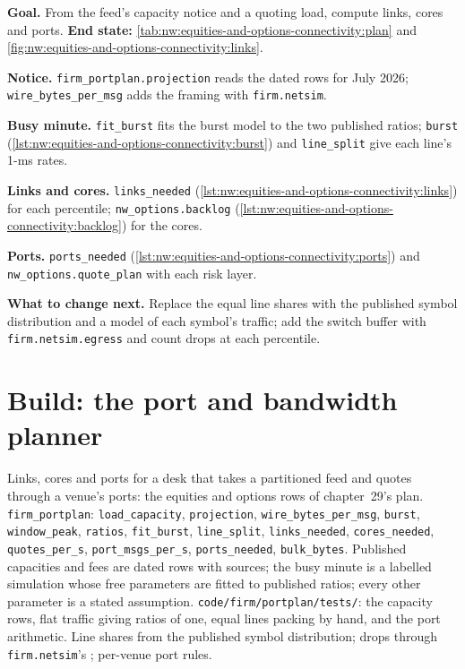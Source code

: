 \begin{tutorial}
\textbf{Goal.} From the feed's capacity notice and a quoting load, compute links, cores and ports.
\textbf{End state:} \cref{tab:nw:equities-and-options-connectivity:plan} and \cref{fig:nw:equities-and-options-connectivity:links}.
\begin{tutsteps}
\item \textbf{Notice.} \texttt{firm\_portplan.projection} reads the dated rows for July 2026; \texttt{wire\_bytes\_per\_msg} adds the
  framing with \texttt{firm.netsim}.
\item \textbf{Busy minute.} \texttt{fit\_burst} fits the burst model to the two published ratios; \texttt{burst}
  (\cref{lst:nw:equities-and-options-connectivity:burst}) and \texttt{line\_split} give each line's 1-ms rates.
\item \textbf{Links and cores.} \texttt{links\_needed} (\cref{lst:nw:equities-and-options-connectivity:links}) for each
  percentile; \texttt{nw\_options.backlog} (\cref{lst:nw:equities-and-options-connectivity:backlog}) for the cores.
\item \textbf{Ports.} \texttt{ports\_needed} (\cref{lst:nw:equities-and-options-connectivity:ports}) and
  \texttt{nw\_options.quote\_plan} with each risk layer.
\end{tutsteps}
\textbf{What to change next.} Replace the equal line shares with the published symbol distribution and a model of each
symbol's traffic; add the switch buffer with \texttt{firm.netsim.egress} and count drops at each percentile.
\end{tutorial}

\section{Build: the port and bandwidth planner}\label{bld:nw:equities-and-options-connectivity:portplan}

\begin{build}
 Links, cores and ports for a desk that takes a partitioned feed and quotes through a venue's ports: the
equities and options rows of chapter~29's plan.
 \texttt{firm\_portplan}: \texttt{load\_capacity}, \texttt{projection}, \texttt{wire\_bytes\_per\_msg},
\texttt{burst}, \texttt{window\_peak}, \texttt{ratios}, \texttt{fit\_burst}, \texttt{line\_split}, \texttt{links\_needed},
\texttt{cores\_needed}, \texttt{quotes\_per\_s}, \texttt{port\_msgs\_per\_s}, \texttt{ports\_needed}, \texttt{bulk\_bytes}.
 Published capacities and fees are dated rows with sources; the busy minute is a labelled simulation whose free
parameters are fitted to published ratios; every other parameter is a stated assumption.
 \texttt{code/firm/portplan/tests/}: the capacity rows, flat traffic giving ratios of one, equal
lines packing by hand, and the port arithmetic.
 Line shares from the published symbol distribution; drops through \texttt{firm.netsim}'s ; per-venue
port rules.
\end{build}

